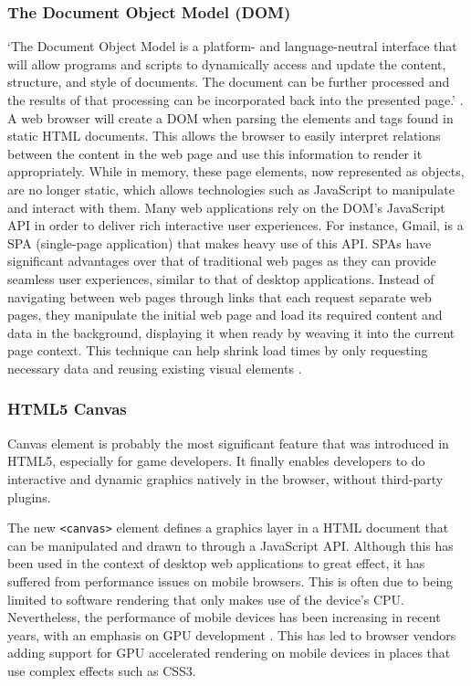 \documentclass[final]{cmpreport}
\begin{document}
\subsubsection{The Document Object Model (DOM)}
`The Document Object Model is a platform- and language-neutral interface that will allow programs and scripts to dynamically access and update the content, structure, and style of documents. The document can be further processed and the results of that processing can be incorporated back into the presented page.' \citep{W3C3}. A web browser will create a DOM when parsing the elements and tags found in static HTML documents. This allows the browser to easily interpret relations between the content in the web page and use this information to render it appropriately. While in memory, these page elements, now represented as objects, are no longer static, which allows technologies such as JavaScript to manipulate and interact with them. Many web applications rely on the DOM's JavaScript API in order to deliver rich interactive user experiences. For instance, Gmail, is a SPA (single-page application) that makes heavy use of this API. SPAs have significant advantages over that of traditional web pages as they can provide seamless user experiences, similar to that of desktop applications. Instead of navigating between web pages through links that each request separate web pages, they manipulate the initial web page and load its required content and data in the background, displaying it when ready by weaving it into the current page context. This technique can help shrink load times by only requesting necessary data and reusing existing visual elements \citep{Takada}.

\subsubsection{HTML5 Canvas}
Canvas element is probably the most significant feature that was introduced in HTML5, especially for game developers. It finally enables developers to do interactive and dynamic graphics natively in the browser, without third-party plugins.

The new \texttt{<canvas>} element defines a graphics layer in a HTML document that can be manipulated and drawn to through a JavaScript API. Although this has been used in the context of desktop web applications to great effect, it has suffered from performance issues on mobile browsers. This is often due to being limited to software rendering that only makes use of the device's CPU. Nevertheless, the performance of mobile devices has been increasing in recent years, with an emphasis on GPU development \cite{Lin}. This has led to browser vendors adding support for GPU accelerated rendering on mobile devices in places that use complex effects such as CSS3.
\end{document}
